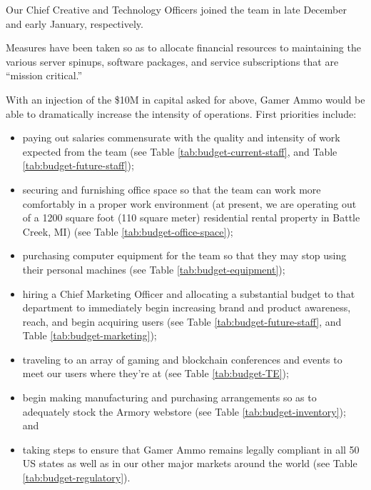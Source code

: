 \documentclass[11pt]{report}
\begin{document}
Our Chief Creative and Technology Officers joined the team in late December and early January, respectively.

Measures have been taken so as to allocate financial resources to maintaining the various server spinups, software packages, and service subscriptions that are ``mission critical.''

With an injection of the \$10M in capital asked for above, Gamer Ammo would be able to dramatically increase the intensity of operations. First priorities include:

\begin{itemize}
\item paying out salaries commensurate with the quality and intensity of work expected from the team (see Table \ref{tab:budget-current-staff}, and Table \ref{tab:budget-future-staff});
\item securing and furnishing office space so that the team can work more comfortably in a proper work environment (at present, we are operating out of a 1200 square foot (110 square meter) residential rental property in Battle Creek, MI) (see Table \ref{tab:budget-office-space});
\item purchasing computer equipment for the team so that they may stop using their personal machines (see Table \ref{tab:budget-equipment});
\item hiring a Chief Marketing Officer and allocating a substantial budget to that department to immediately begin increasing brand and product awareness, reach, and begin acquiring users (see Table \ref{tab:budget-future-staff}, and  Table \ref{tab:budget-marketing});
\item traveling to an array of gaming and blockchain conferences and events to meet our users where they're at (see Table \ref{tab:budget-TE});
\item begin making manufacturing and purchasing arrangements so as to adequately stock the Armory webstore (see Table \ref{tab:budget-inventory}); and
\item taking steps to ensure that Gamer Ammo remains legally compliant in all 50 US states as well as in our other major markets around the world (see Table \ref{tab:budget-regulatory}).
\end{itemize}
\end{document}
